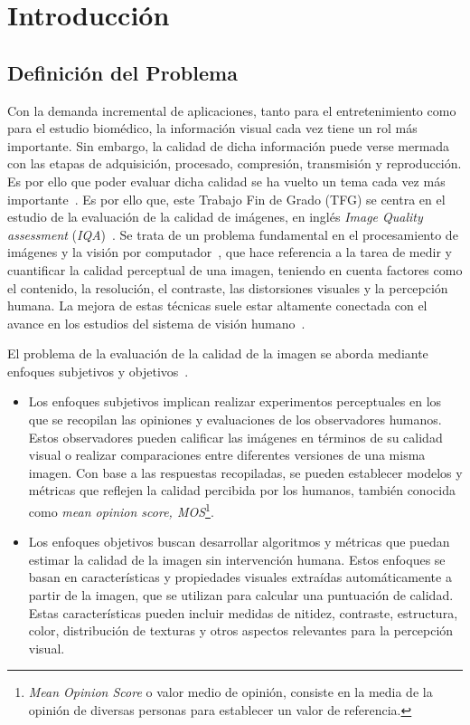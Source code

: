 \chapter{Introducción}
\section{Definición del Problema}   
Con la demanda incremental de aplicaciones, tanto para el entretenimiento 
como para el estudio biomédico, la información visual cada vez tiene un rol 
más importante. Sin embargo, la calidad de dicha información puede 
verse mermada con las etapas de adquisición, procesado, compresión, transmisión y reproducción.
Es por ello que poder evaluar dicha calidad se ha vuelto un 
tema cada vez más importante~\cite{RecentIQASurvey, IQABook, VisualMedicalQualityBook}.
Es por ello que, este Trabajo Fin de Grado (TFG) se centra en el estudio de la 
evaluación de la calidad de imágenes,
en inglés \emph{Image Quality assessment} (\emph{IQA})~\cite{MinkowskiFailure}.
Se trata de un problema fundamental en el procesamiento de imágenes y la visión 
por computador~\cite{CVAlgorithms,CVGeometry,CVModern,CVProcessing}, que hace referencia a la tarea de medir y cuantificar 
la calidad perceptual de una imagen, 
teniendo en cuenta factores como el contenido, la resolución, 
el contraste, las distorsiones visuales y la percepción humana. 
La mejora de estas técnicas suele estar altamente conectada con el avance 
en los estudios del sistema de visión humano~\cite{Wang2006ModernIQ}.
 
El problema de la evaluación de la calidad de la imagen se aborda mediante enfoques 
subjetivos y objetivos~\cite{Wang2006ModernIQ}. 
\begin{itemize}
  \item Los enfoques subjetivos implican realizar experimentos 
perceptuales en los que se recopilan las opiniones y evaluaciones de los observadores 
humanos. Estos observadores pueden calificar las imágenes en términos de su 
calidad visual o realizar comparaciones entre diferentes versiones de una misma imagen. 
Con base a las respuestas recopiladas, se pueden establecer modelos y 
métricas que reflejen la calidad percibida por los humanos, también conocida
como \emph{mean opinion score, MOS}\footnote{
\emph{Mean Opinion Score} o valor medio de opinión, consiste en 
la media de la opinión de diversas personas para establecer un valor de referencia. 
}.
\item Los enfoques objetivos buscan desarrollar algoritmos y métricas 
que puedan estimar la calidad de la imagen sin intervención humana. 
Estos enfoques se basan en características y propiedades visuales extraídas automáticamente a partir de la 
imagen, que se utilizan para calcular una puntuación de calidad. Estas características 
pueden incluir medidas de nitidez, contraste, estructura, color, distribución de 
texturas y otros aspectos relevantes para la percepción visual.
\end{itemize}
 
